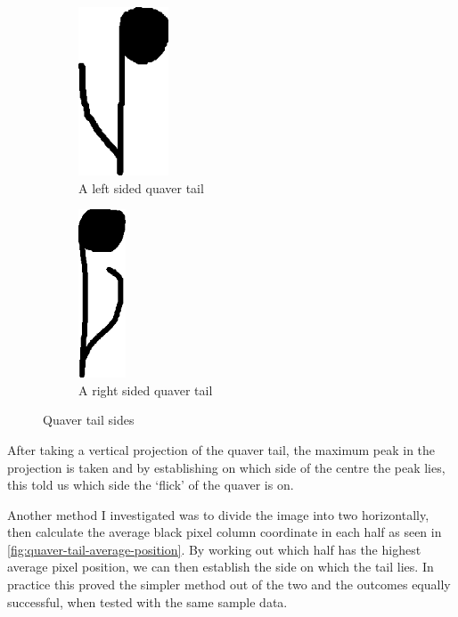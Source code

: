 \begin{figure}[h!]
    \centering

    \begin{subfigure}[b]{.45\linewidth}
        \centering
      \includegraphics[height=5cm]{gfx/techniques/quaver-left-6087.png}
      \caption{A left sided quaver tail}
      \label{fig:quaver-tail-left}
    \end{subfigure}
    \begin{subfigure}[b]{.45\linewidth}
        \centering
      \includegraphics[height=5cm]{gfx/techniques/quaver-right-3083.png}
      \caption{A right sided quaver tail}
      \label{fig:quaver-tail-right}
    \end{subfigure}

    \caption{Quaver tail sides}
\end{figure}

After taking a vertical projection of the quaver tail, the maximum peak in the projection is taken and by establishing on which side of the centre the peak lies, this told us which side the `flick' of the quaver is on.

Another method I investigated was to divide the image into two horizontally, then calculate the average black pixel column coordinate in each half as seen in \cref{fig:quaver-tail-average-position}. By working out which half has the highest average pixel position, we can then establish the side on which the tail lies. In practice this proved the simpler method out of the two and the outcomes equally successful, when tested with the same sample data.

